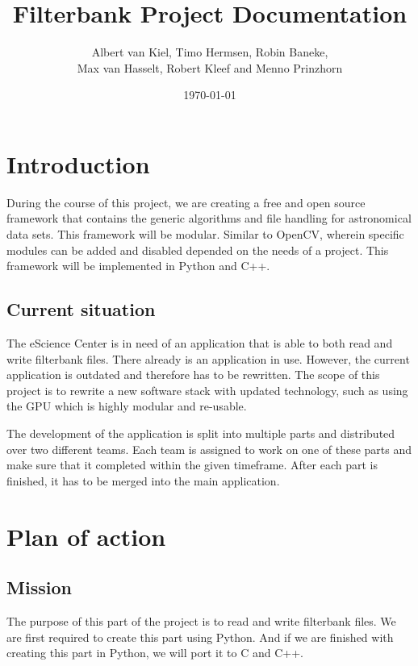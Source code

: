 \documentclass[a4paper,11pt]{report}
\title{Filterbank Project Documentation}
\author{Albert van Kiel, Timo Hermsen, Robin Baneke,\\ Max van Hasselt, Robert Kleef and Menno Prinzhorn}
\date{\today}
\begin{document}
    
    \maketitle
    
    \chapter{Introduction}
    
    During the course of this project, we are creating a free and open source framework that contains the generic algorithms and file handling for astronomical data sets. 
    This framework will be modular. Similar to OpenCV, wherein specific modules can be added and disabled depended on the needs of a project. 
    This framework will be implemented in Python and C++.
    
    \section{Current situation}
    
    The eScience Center is in need of an application that is able to both read and write filterbank files. There already is an application in use. 
    However, the current application is outdated and therefore has to be rewritten. The scope of this project is to rewrite a new software stack with updated technology, 
    such as using the GPU which is highly modular and re-usable.
    
    The development of the application is split into multiple parts and distributed over two different teams. Each team is assigned to work on one of these parts and 
    make sure that it completed within the given timeframe. After each part is finished, it has to be merged into the main application.
    
    \chapter{Plan of action}
    
    \section{Mission}
    
    The purpose of this part of the project is to read and write filterbank files. We are first required to create this part using Python. 
    And if we are finished with creating this part in Python, we will port it to C and C++.
    
\end{document}
